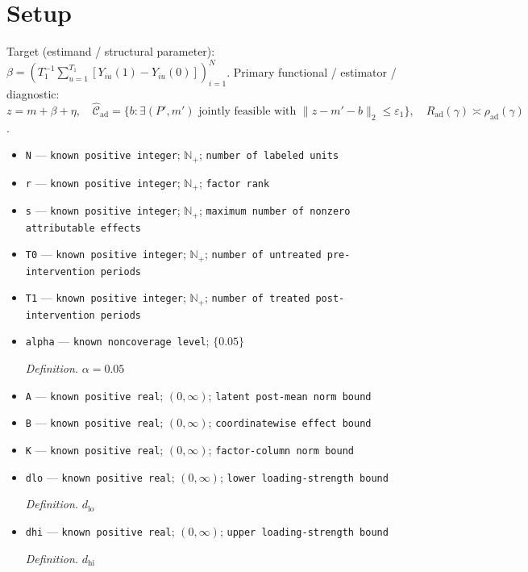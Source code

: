 \documentclass{article}
\begin{document}
\section{Setup}

Target (estimand / structural parameter): \(\beta=(T_1^{-1}\sum_{u=1}^{T_1}[Y_{iu}(1)-Y_{iu}(0)])_{i=1}^{N}\).
Primary functional / estimator / diagnostic: \(z=m+\beta+\eta,\quad \widehat{\mathcal C}_{\mathrm{ad}}=\{b:\exists(P',m')\text{ jointly feasible with }\|z-m'-b\|_2\le\varepsilon_1\},\quad R_{\mathrm{ad}}(\gamma)\asymp\rho_{\mathrm{ad}}(\gamma)\).
\begin{itemize}
  \item \texttt{N} --- \texttt{known positive integer}; \(\mathbb N_{+}\); \texttt{number of labeled units}
  \item \texttt{r} --- \texttt{known positive integer}; \(\mathbb N_{+}\); \texttt{factor rank}
  \item \texttt{s} --- \texttt{known positive integer}; \(\mathbb N_{+}\); \texttt{maximum number of nonzero attributable effects}
  \item \texttt{T0} --- \texttt{known positive integer}; \(\mathbb N_{+}\); \texttt{number of untreated pre-\allowbreak{}intervention periods}
  \item \texttt{T1} --- \texttt{known positive integer}; \(\mathbb N_{+}\); \texttt{number of treated post-\allowbreak{}intervention periods}
  \item \texttt{alpha} --- \texttt{known noncoverage level}; \(\{0.05\}\)
  \par\smallskip\noindent\emph{Definition.} \(\alpha=0.05\)
  \item \texttt{A} --- \texttt{known positive real}; \((0,\infty)\); \texttt{latent post-\allowbreak{}mean norm bound}
  \item \texttt{B} --- \texttt{known positive real}; \((0,\infty)\); \texttt{coordinatewise effect bound}
  \item \texttt{K} --- \texttt{known positive real}; \((0,\infty)\); \texttt{factor-\allowbreak{}column norm bound}
  \item \texttt{dlo} --- \texttt{known positive real}; \((0,\infty)\); \texttt{lower loading-\allowbreak{}strength bound}
  \par\smallskip\noindent\emph{Definition.} \(d_{\mathrm{lo}}\)
  \item \texttt{dhi} --- \texttt{known positive real}; \((0,\infty)\); \texttt{upper loading-\allowbreak{}strength bound}
  \par\smallskip\noindent\emph{Definition.} \(d_{\mathrm{hi}}\)

\end{itemize}
\end{document}
